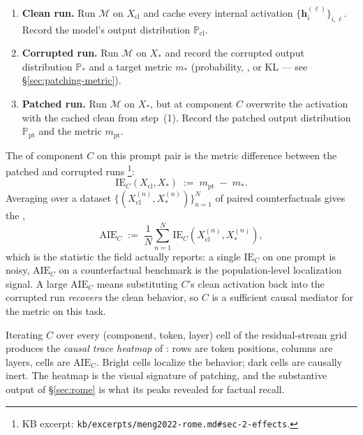 \begin{enumerate}
  \item \textbf{Clean run.} Run $\mathcal{M}$ on $X_{\text{cl}}$ and
    cache every internal activation
    $\{\mathbf{h}_i^{(\ell)}\}_{i,\ell}$. Record the model's output
    distribution $\mathbb{P}_{\text{cl}}$.
  \item \textbf{Corrupted run.} Run $\mathcal{M}$ on $X_{*}$ and record
    the corrupted output distribution $\mathbb{P}_{*}$ and a target
    metric $m_{*}$ (probability, , or KL --- see
    \S\ref{sec:patching-metric}).
  \item \textbf{Patched run.} Run $\mathcal{M}$ on $X_{*}$, but at
    component $C$ overwrite the activation with the cached clean 
    from step~(1). Record the patched output distribution
    $\mathbb{P}_{\text{pt}}$ and the metric $m_{\text{pt}}$.
\end{enumerate}

The \emph{} of component $C$ on this prompt pair is the
metric difference between the patched and corrupted runs
\citep[\S 2]{meng2022-rome}\footnote{KB excerpt:
\nolinkurl{kb/excerpts/meng2022-rome.md#sec-2-effects}.}:
\begin{equation}
  \mathrm{IE}_C(X_{\text{cl}}, X_{*}) \;:=\; m_{\text{pt}} \;-\; m_{*}.
  \label{eq:ie-definition}
\end{equation}
Averaging over a dataset $\{(X_{\text{cl}}^{(n)}, X_{*}^{(n)})\}_{n=1}^{N}$
of paired counterfactuals gives the \emph{}
\citep[\S 2]{meng2022-rome},
\begin{equation}
  \mathrm{AIE}_C \;:=\;
  \frac{1}{N} \sum_{n=1}^{N} \mathrm{IE}_C(X_{\text{cl}}^{(n)}, X_{*}^{(n)}),
  \label{eq:aie}
\end{equation}
which is the statistic the field actually reports: a single
$\mathrm{IE}_C$ on one prompt is noisy, $\mathrm{AIE}_C$ on a
counterfactual benchmark is the population-level localization signal.
A large $\mathrm{AIE}_C$ means substituting $C$'s clean activation back
into the corrupted run \emph{recovers} the clean behavior, so $C$ is a
sufficient causal mediator for the metric on this task.

Iterating $C$ over every (component, token, layer) cell of the
residual-stream grid produces the \emph{causal trace heatmap} of
\citet[Fig.~1]{meng2022-rome}: rows are token positions, columns are
layers, cells are $\mathrm{AIE}_C$. Bright cells localize the behavior;
dark cells are causally inert. The heatmap is the visual signature of
patching, and the substantive output of \S\ref{sec:rome} is what its
peaks revealed for factual recall.

